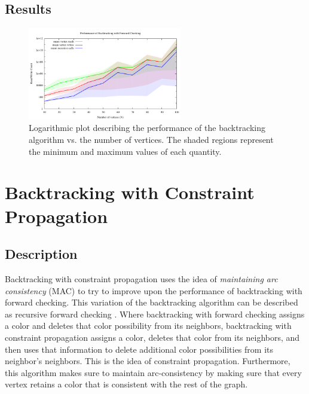 \documentclass{article}
\begin{document}
	\subsection{Results}
	
		\begin{figure}[h!]
			\centering
			\includegraphics[width=0.6\textwidth]{../results_5/backtracking_forward/bt_forward_performance}
			\caption{Logarithmic plot describing the performance of the backtracking algorithm vs. the number of vertices. The shaded regions represent the minimum and maximum values of each quantity.}
		\end{figure}
	
\section{Backtracking with Constraint Propagation}

	\subsection{Description}
	
		Backtracking with constraint propagation uses the idea of \textit{maintaining arc consistency} (MAC) to try to improve upon the performance of backtracking with forward checking. This variation of the backtracking algorithm can be described as recursive forward checking \cite{ai}. Where backtracking with forward checking assigns a color and deletes that color possibility from its neighbors, backtracking with constraint propagation assigns a color, deletes that color from its neighbors, and then uses that information to delete additional color possibilities from its neighbor's neighbors. This is the idea of constraint propagation. Furthermore, this algorithm makes sure to maintain arc-consistency by making sure that every vertex retains a color that is consistent with the rest of the graph.
	
\end{document}
